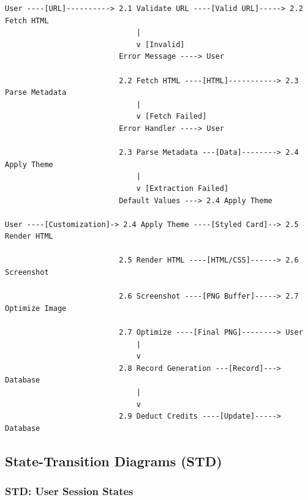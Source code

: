 \documentclass[12pt,a4paper]{article}
\begin{document}
\begin{verbatim}
User ----[URL]----------> 2.1 Validate URL ----[Valid URL]-----> 2.2 Fetch HTML
                              |
                              v [Invalid]
                          Error Message ----> User
                              
                          2.2 Fetch HTML ----[HTML]-----------> 2.3 Parse Metadata
                              |
                              v [Fetch Failed]
                          Error Handler ----> User
                          
                          2.3 Parse Metadata ---[Data]--------> 2.4 Apply Theme
                              |
                              v [Extraction Failed]
                          Default Values ---> 2.4 Apply Theme
                          
User ----[Customization]-> 2.4 Apply Theme ----[Styled Card]--> 2.5 Render HTML
                          
                          2.5 Render HTML ----[HTML/CSS]------> 2.6 Screenshot
                          
                          2.6 Screenshot ----[PNG Buffer]-----> 2.7 Optimize Image
                          
                          2.7 Optimize ----[Final PNG]--------> User
                              |
                              v
                          2.8 Record Generation ---[Record]---> Database
                              |
                              v
                          2.9 Deduct Credits ----[Update]-----> Database
\end{verbatim}

\subsection{State-Transition Diagrams (STD)}

\subsubsection{STD: User Session States}
\end{document}
